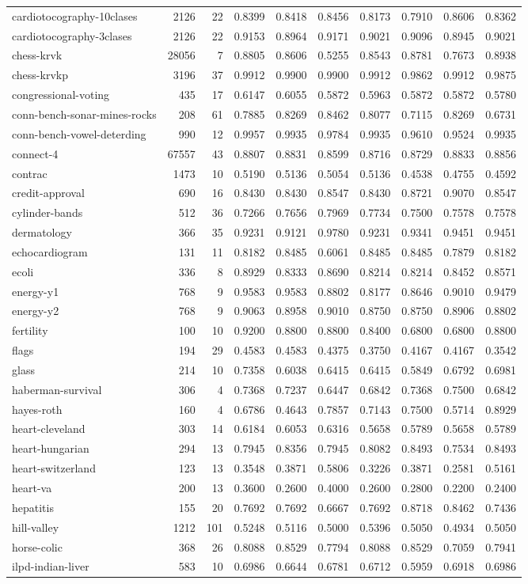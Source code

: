 \documentclass{article}
\begin{document}
\begin{table}
\begin{tabular}{lrrlllllll}
cardiotocography-10clases & 2126 & 22 & 0.8399 & 0.8418 & 0.8456 & 0.8173 & 0.7910 & 0.8606 & 0.8362\tabularnewline
cardiotocography-3clases & 2126 & 22 & 0.9153 & 0.8964 & 0.9171 & 0.9021 & 0.9096 & 0.8945 & 0.9021\tabularnewline
chess-krvk & 28056 & 7 & 0.8805 & 0.8606 & 0.5255 & 0.8543 & 0.8781 & 0.7673 & 0.8938\tabularnewline
chess-krvkp & 3196 & 37 & 0.9912 & 0.9900 & 0.9900 & 0.9912 & 0.9862 & 0.9912 & 0.9875\tabularnewline
congressional-voting & 435 & 17 & 0.6147 & 0.6055 & 0.5872 & 0.5963 & 0.5872 & 0.5872 & 0.5780\tabularnewline
conn-bench-sonar-mines-rocks & 208 & 61 & 0.7885 & 0.8269 & 0.8462 & 0.8077 & 0.7115 & 0.8269 & 0.6731\tabularnewline
conn-bench-vowel-deterding & 990 & 12 & 0.9957 & 0.9935 & 0.9784 & 0.9935 & 0.9610 & 0.9524 & 0.9935\tabularnewline
connect-4 & 67557 & 43 & 0.8807 & 0.8831 & 0.8599 & 0.8716 & 0.8729 & 0.8833 & 0.8856\tabularnewline
contrac & 1473 & 10 & 0.5190 & 0.5136 & 0.5054 & 0.5136 & 0.4538 & 0.4755 & 0.4592\tabularnewline
credit-approval & 690 & 16 & 0.8430 & 0.8430 & 0.8547 & 0.8430 & 0.8721 & 0.9070 & 0.8547\tabularnewline
cylinder-bands & 512 & 36 & 0.7266 & 0.7656 & 0.7969 & 0.7734 & 0.7500 & 0.7578 & 0.7578\tabularnewline
dermatology & 366 & 35 & 0.9231 & 0.9121 & 0.9780 & 0.9231 & 0.9341 & 0.9451 & 0.9451\tabularnewline
echocardiogram & 131 & 11 & 0.8182 & 0.8485 & 0.6061 & 0.8485 & 0.8485 & 0.7879 & 0.8182\tabularnewline
ecoli & 336 & 8 & 0.8929 & 0.8333 & 0.8690 & 0.8214 & 0.8214 & 0.8452 & 0.8571\tabularnewline
energy-y1 & 768 & 9 & 0.9583 & 0.9583 & 0.8802 & 0.8177 & 0.8646 & 0.9010 & 0.9479\tabularnewline
energy-y2 & 768 & 9 & 0.9063 & 0.8958 & 0.9010 & 0.8750 & 0.8750 & 0.8906 & 0.8802\tabularnewline
fertility & 100 & 10 & 0.9200 & 0.8800 & 0.8800 & 0.8400 & 0.6800 & 0.6800 & 0.8800\tabularnewline
flags & 194 & 29 & 0.4583 & 0.4583 & 0.4375 & 0.3750 & 0.4167 & 0.4167 & 0.3542\tabularnewline
glass & 214 & 10 & 0.7358 & 0.6038 & 0.6415 & 0.6415 & 0.5849 & 0.6792 & 0.6981\tabularnewline
haberman-survival & 306 & 4 & 0.7368 & 0.7237 & 0.6447 & 0.6842 & 0.7368 & 0.7500 & 0.6842\tabularnewline
hayes-roth & 160 & 4 & 0.6786 & 0.4643 & 0.7857 & 0.7143 & 0.7500 & 0.5714 & 0.8929\tabularnewline
heart-cleveland & 303 & 14 & 0.6184 & 0.6053 & 0.6316 & 0.5658 & 0.5789 & 0.5658 & 0.5789\tabularnewline
heart-hungarian & 294 & 13 & 0.7945 & 0.8356 & 0.7945 & 0.8082 & 0.8493 & 0.7534 & 0.8493\tabularnewline
heart-switzerland & 123 & 13 & 0.3548 & 0.3871 & 0.5806 & 0.3226 & 0.3871 & 0.2581 & 0.5161\tabularnewline
heart-va & 200 & 13 & 0.3600 & 0.2600 & 0.4000 & 0.2600 & 0.2800 & 0.2200 & 0.2400\tabularnewline
hepatitis & 155 & 20 & 0.7692 & 0.7692 & 0.6667 & 0.7692 & 0.8718 & 0.8462 & 0.7436\tabularnewline
hill-valley & 1212 & 101 & 0.5248 & 0.5116 & 0.5000 & 0.5396 & 0.5050 & 0.4934 & 0.5050\tabularnewline
horse-colic & 368 & 26 & 0.8088 & 0.8529 & 0.7794 & 0.8088 & 0.8529 & 0.7059 & 0.7941\tabularnewline
ilpd-indian-liver & 583 & 10 & 0.6986 & 0.6644 & 0.6781 & 0.6712 & 0.5959 & 0.6918 & 0.6986\tabularnewline
\end{tabular}
\end{table}
\end{document}
